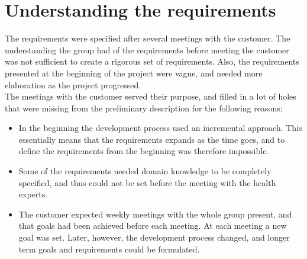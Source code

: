 \section{Understanding the requirements}

The requirements were specified after several meetings with the customer. The understanding the group had of the requirements before meeting the customer was not sufficient to create a rigorous set of requirements. Also, the requirements presented at the beginning of the project were vague, and needed more elaboration as the project progressed. \\

The meetings with the customer served their purpose, and filled in a lot of holes that were missing from the preliminary description for the following reasons:
\begin{itemize}
\item In the beginning the development process used an incremental approach. This essentially means that the requirements expands as the time goes, and to define the requirements from the beginning was therefore impossible.
\item Some of the requirements needed domain knowledge to be completely specified, and thus could not be set before the meeting with the health experts.
\item The customer expected weekly meetings with the whole group present, and that goals had been achieved before each meeting. At each meeting a new goal was set. Later, however, the development process changed, and longer term goals and requirements could be formulated. 
\end{itemize}

